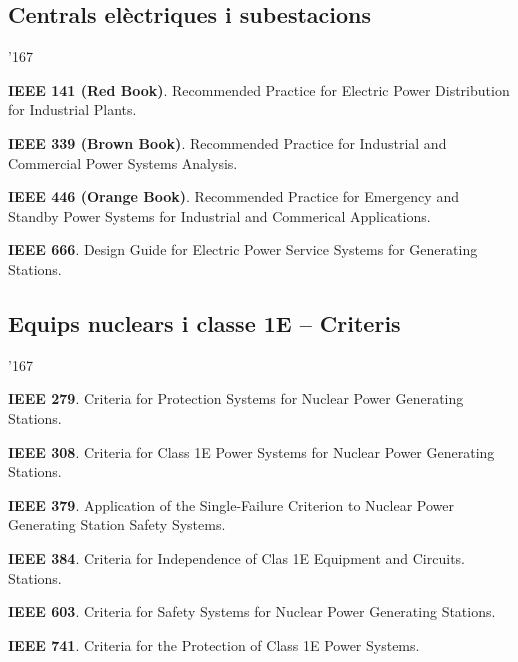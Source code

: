 \subsection*{Centrals el\`{e}ctriques i subestacions}
\begin{dinglist}{'167}
    \item \textbf{IEEE 141 (Red Book)}. Recommended Practice for Electric Power Distribution for Industrial Plants.
    \item \textbf{IEEE 339 (Brown Book)}. Recommended Practice for Industrial and Commercial Power Systems Analysis.
    \item \textbf{IEEE 446 (Orange Book)}. Recommended Practice for Emergency and Standby Power Systems for Industrial and Commerical Applications.
    \item \textbf{IEEE 666}. Design Guide for Electric Power Service Systems for Generating Stations.
\end{dinglist}


\subsection*{Equips nuclears i classe 1E -- Criteris} 
\begin{dinglist}{'167}
    \item \textbf{IEEE 279}. Criteria for Protection Systems for Nuclear Power Generating Stations.
    \item \textbf{IEEE 308}. Criteria for Class 1E Power Systems for Nuclear Power Generating Stations.
    \item \textbf{IEEE 379}. Application of the Single-Failure Criterion to Nuclear Power Generating Station Safety Systems.
    \item \textbf{IEEE 384}. Criteria for Independence of Clas 1E Equipment and Circuits.
        Stations.
    \item \textbf{IEEE 603}. Criteria for Safety Systems for Nuclear Power Generating Stations.
    \item \textbf{IEEE 741}. Criteria for the Protection of Class 1E Power Systems.
\end{dinglist}


